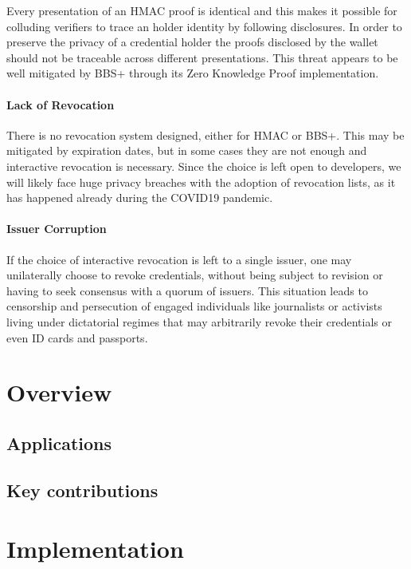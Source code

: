\documentclass[conference]{IEEEtran}
\begin{document}
Every presentation of an HMAC proof is identical and this makes it possible for colluding verifiers to trace an holder identity by following disclosures. In order to preserve the privacy of a credential holder the proofs disclosed by the wallet should not be traceable across different presentations. This threat appears to be well mitigated by BBS+ through its Zero Knowledge Proof implementation.

\paragraph{Lack of Revocation}

There is no revocation system designed, either for HMAC or BBS+. This may be mitigated by expiration dates, but in some cases they are not enough and interactive revocation is necessary. Since the choice is left open to developers, we will likely face huge privacy breaches with the adoption of revocation lists, as it has happened already during the COVID19 pandemic.



\paragraph{Issuer Corruption}

If the choice of interactive revocation is left to a single issuer, one may unilaterally choose to revoke credentials, without being subject to revision or having to seek consensus with a quorum of issuers. This situation leads to censorship and persecution of engaged individuals like journalists or activists living under dictatorial regimes that may arbitrarily revoke their credentials or even ID cards and passports.

\section{Overview}

\subsection{Applications}
\subsection{Key contributions}

\section{Implementation}
\end{document}

